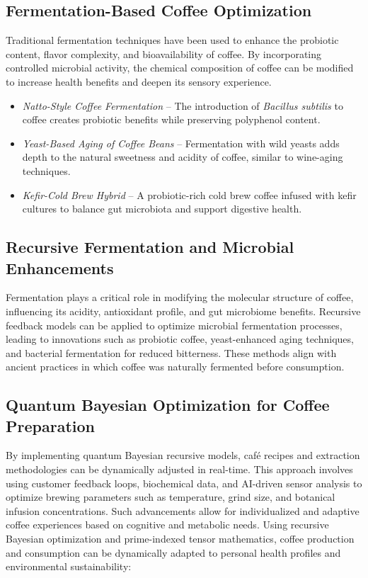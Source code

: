\documentclass{article}
\theoremstyle{plain}
\theoremstyle{claimstyle}
\begin{document}
\subsection{Fermentation-Based Coffee Optimization}
Traditional fermentation techniques have been used to enhance the probiotic content, flavor complexity, and bioavailability of coffee. By incorporating controlled microbial activity, the chemical composition of coffee can be modified to increase health benefits and deepen its sensory experience.

\begin{itemize}
    \item \textit{Natto-Style Coffee Fermentation} – The introduction of \textit{Bacillus subtilis} to coffee creates probiotic benefits while preserving polyphenol content.
    \item \textit{Yeast-Based Aging of Coffee Beans} – Fermentation with wild yeasts adds depth to the natural sweetness and acidity of coffee, similar to wine-aging techniques.
    \item \textit{Kefir-Cold Brew Hybrid} – A probiotic-rich cold brew coffee infused with kefir cultures to balance gut microbiota and support digestive health.
\end{itemize}
\subsection{Recursive Fermentation and Microbial Enhancements}
Fermentation plays a critical role in modifying the molecular structure of coffee, influencing its acidity, antioxidant profile, and gut microbiome benefits. Recursive feedback models can be applied to optimize microbial fermentation processes, leading to innovations such as probiotic coffee, yeast-enhanced aging techniques, and bacterial fermentation for reduced bitterness. These methods align with ancient practices in which coffee was naturally fermented before consumption.

\subsection{Quantum Bayesian Optimization for Coffee Preparation}
By implementing quantum Bayesian recursive models, café recipes and extraction methodologies can be dynamically adjusted in real-time. This approach involves using customer feedback loops, biochemical data, and AI-driven sensor analysis to optimize brewing parameters such as temperature, grind size, and botanical infusion concentrations. Such advancements allow for individualized and adaptive coffee experiences based on cognitive and metabolic needs.
Using recursive Bayesian optimization and prime-indexed tensor mathematics, coffee production and consumption can be dynamically adapted to personal health profiles and environmental sustainability:
\end{document}
